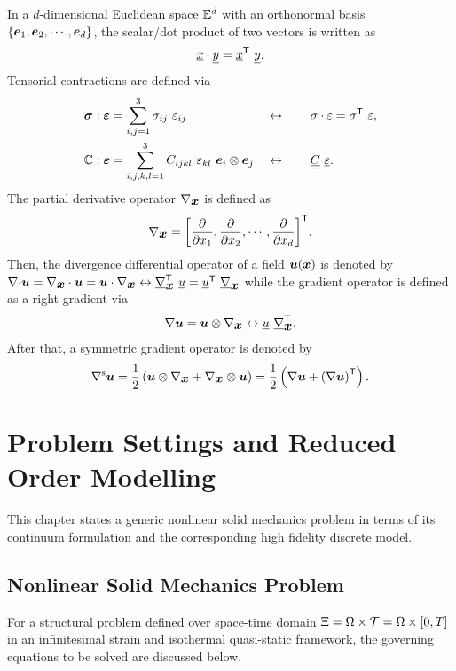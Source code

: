 In a $d$-dimensional Euclidean space ${\mathbb{ E}}^d$ with an orthonormal basis $\{\mbox{$\bm  e$}_1,\mbox{$\bm  e$}_2,\cdots,\mbox{$\bm  e$}_d\}$, the scalar/dot product of two vectors is written as
\begin{equation}
	\underline{x} \cdot \underline{y} = {\underline{x}}^{\sf T} \  \underline{y}.
\end{equation}
Tensorial contractions are defined via
\begin{align}
	\mbox{$\bm \sigma$} : \mbox{$\bm \varepsilon $} & = \sum_{i,j=1}^{3} \sigma_{ij} \  \varepsilon_{ij}                                   &  & \leftrightarrow \qquad \underline{\sigma} \cdot \underline{\varepsilon} = {\underline{\sigma} }^{\sf T} \  \underline{\varepsilon}, \\
	{\mathbb{ C}} : \mbox{$\bm \varepsilon $}    & = \sum_{i,j,k,l=1}^{3} C_{ijkl} \  \varepsilon_{kl} \  \mbox{$\bm  e$}_i \otimes \mbox{$\bm  e$}_j &  & \leftrightarrow \qquad \underline{\underline{C}} \  \underline{\varepsilon}.
\end{align}
The partial derivative operator $\nabla_{\mbox{$\bm  x$}}$ is defined as
\begin{equation}
	\nabla_{\mbox{$\bm  x$}} = {\left[ \displaystyle\frac{\displaystyle\partial }{\displaystyle\partial x_1},\displaystyle\frac{\displaystyle\partial }{\displaystyle\partial x_2},\cdots,\displaystyle\frac{\displaystyle\partial }{\displaystyle\partial x_d} \right]}^{\sf T}.
\end{equation}
Then, the divergence differential operator of a field $\mbox{$\bm  u$}(\mbox{$\bm  x$})$ is denoted by ${\rm \nabla \cdot } \mbox{$\bm  u$} = \nabla_{\mbox{$\bm  x$}} \cdot \mbox{$\bm  u$} = \mbox{$\bm  u$} \cdot \nabla_{\mbox{$\bm  x$}} \leftrightarrow {\underline{\nabla}_{\mbox{$\bm  x$}}^{\sf{T}}} \  {\underline{u}} = {\underline{u}^{\sf{T}}} \  {\underline{\nabla}_{\mbox{$\bm  x$}}}$ while the gradient operator is defined as a right gradient via
\begin{equation}
	{\rm \nabla} \mbox{$\bm  u$} = \mbox{$\bm  u$} \otimes \nabla_{\mbox{$\bm  x$}} \leftrightarrow  \underline{u} \  {\underline{\nabla}_{\mbox{$\bm  x$}}^{\sf {T}}}.
\end{equation}
After that, a symmetric gradient operator is denoted by
\begin{equation}
	{\rm \nabla^s} \mbox{$\bm  u$} = \frac{1}{2} \left( \mbox{$\bm  u$} \otimes \nabla_{\mbox{$\bm  x$}} + \nabla_{\mbox{$\bm  x$}} \otimes \mbox{$\bm  u$}  \right) = \frac{1}{2} \left({\rm \nabla} \mbox{$\bm  u$}+{({\rm \nabla} \mbox{$\bm  u$})}^{\sf T}\right).
\end{equation}


\chapter{Problem Settings and Reduced Order Modelling}
\label{problem_settings}
This chapter states a generic nonlinear solid mechanics problem in terms of its continuum formulation and the corresponding high fidelity discrete model.

\section{Nonlinear Solid Mechanics Problem}
For a structural problem defined over space-time domain $\Xi = \Omega \times {\cal T} = \Omega \times [0, T]$ in an infinitesimal strain and isothermal quasi-static framework, the governing equations to be solved are discussed below.

